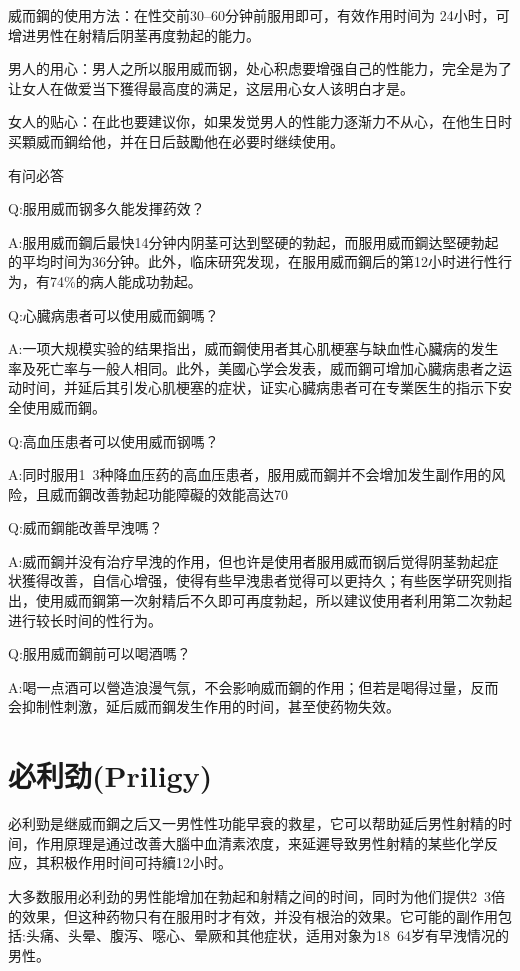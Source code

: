 \documentclass[12pt,UTF8]{ctexbook}
\begin{document}
威而鋼的使用方法：在性交前30--60分钟前服用即可，有效作用时间为
24小时，可增进男性在射精后阴茎再度勃起的能力。

男人的用心：男人之所以服用威而钢，处心积虑要增强自己的性能力，完全是为了让女人在做爱当下獲得最高度的满足，这层用心女人该明白才是。

女人的贴心：在此也要建议你，如果发觉男人的性能力逐渐力不从心，在他生日时买顆威而鋼给他，并在日后鼓勵他在必要时继续使用。

有问必答

Q:服用威而钢多久能发揮药效？

A:服用威而鋼后最快14分钟内阴茎可达到堅硬的勃起，而服用威而鋼达堅硬勃起的平均时间为36分钟。此外，临床研究发现，在服用威而鋼后的第12小时进行性行为，有74\%的病人能成功勃起。

Q:心臓病患者可以使用威而鋼嗎？

A:一项大规模实验的结果指出，威而鋼使用者其心肌梗塞与缺血性心臟病的发生率及死亡率与一般人相同。此外，美國心学会发表，威而鋼可增加心臓病患者之运动时间，并延后其引发心肌梗塞的症状，证实心臓病患者可在专業医生的指示下安全使用威而鋼。

Q:高血压患者可以使用威而钢嗎？

A:同时服用1~3种降血压药的高血压患者，服用威而鋼并不会增加发生副作用的风险，且威而鋼改善勃起功能障礙的效能高达70%

Q:威而鋼能改善早洩嗎？

A:威而鋼并没有治疗早洩的作用，但也许是使用者服用威而钢后觉得阴茎勃起症状獲得改善，自信心增强，使得有些早洩患者觉得可以更持久；有些医学研究则指出，使用威而鋼第一次射精后不久即可再度勃起，所以建议使用者利用第二次勃起进行较长时间的性行为。

Q:服用威而鋼前可以喝酒嗎？

A:喝一点酒可以營造浪漫气氛，不会影响威而鋼的作用；但若是喝得过量，反而会抑制性刺激，延后威而鋼发生作用的时间，甚至使药物失效。

\section{必利劲(Priligy)}

必利勁是继威而鋼之后又一男性性功能早衰的救星，它可以帮助延后男性射精的时间，作用原理是通过改善大腦中血清素浓度，来延遲导致男性射精的某些化学反应，其积极作用时间可持續12小时。

大多数服用必利劲的男性能增加在勃起和射精之间的时间，同时为他们提供2~3倍的效果，但这种药物只有在服用时才有效，并没有根治的效果。它可能的副作用包括:头痛、头晕、腹泻、噁心、晕厥和其他症状，适用对象为18~64岁有早洩情况的男性。
\end{document}
